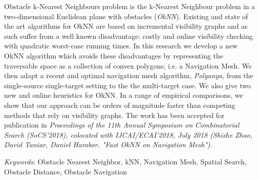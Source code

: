 Obstacle k-Nearest Neighbours problem is the k-Nearest Neighbour problem in a 
two-dimensional Euclidean plane with obstacles (\emph{OkNN}).
Existing and state of the art algorithms for OkNN are based on incremental 
visibility graphs and as such suffer from a well known disadvantage: costly 
and online visibility checking with quadratic worst-case running times.
In this research we develop a new OkNN algorithm which avoids these disadvantages
by representing the traversable space as a collection of convex polygons; i.e.
a Navigation Mesh. 
We then adapt a recent and optimal navigation mesh algorithm, \textit{Polyanya}, from the
single-source single-target setting to the the multi-target case. 
We also give two new and online heuristics for OkNN.
In a range of empirical comparisons, we show that our approach can be orders of magnitude faster than competing methods that rely on visibility graphs.
The work has been accepted for publication in \textit{Proceedings of the 11th Annual Symposium on Combinatorial Search (SoCS’2018), colocated with
IJCAI/ECAI’2018, July 2018 (Shizhe Zhao, David Taniar, Daniel Harabor, "Fast OkNN on Navigation
Mesh")}.

\textit{Keywords}: Obstacle Nearest Neighbor, kNN, Navigation Mesh, Spatial Search, Obstacle
Distance, Obstacle Navigation
